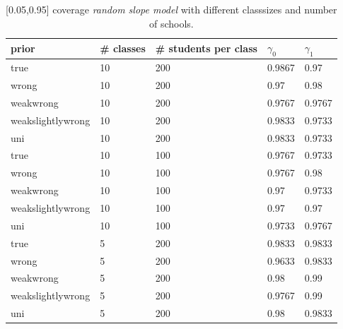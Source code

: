 \begin{table}[!ht]
\begin{center}
\begin{tabular}{l l l l  l}
prior & \# classes & \#  students per class &  $\gamma_0$ & $ \gamma_1$ \\
\hline
\hline
true & 10  &  200  &  0.9867  &  0.97\\
wrong & 10  &  200  &  0.97  &  0.98\\
weakwrong & 10  &  200  &  0.9767  &  0.9767\\
weakslightlywrong & 10  &  200  &  0.9833  &  0.9733\\
uni & 10  &  200  &  0.9833  &  0.9733\\
\hline
true &10  &  100  &  0.9767  &  0.9733\\
wrong & 10  &  100  &  0.9767  &  0.98\\
weakwrong & 10  &  100  &  0.97  &  0.9733 \\
weakslightlywrong &10  &  100  &  0.97  &  0.97\\
uni &10  &  100  &  0.9733  &  0.9767\\ 
\hline
true & 5  &  200  &  0.9833  &  0.9833\\
wrong & 5  &  200  &  0.9633  &  0.9833\\
weakwrong & 5  &  200  &  0.98  &  0.99\\
weakslightlywrong &5  &  200  &  0.9767  &  0.99\\
uni &5  &  200  &  0.98  &  0.9833\\
\end{tabular}
\end{center}
\caption{[0.05,0.95] coverage \emph{random slope model}  with different classsizes and number of schools. }
\label{tab:coverage}
\end{table}


